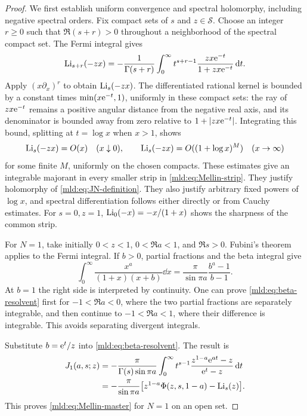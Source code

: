 \begin{proof}
We first establish uniform convergence and spectral holomorphy, including negative spectral orders. Fix compact sets of $s$ and $z\in\mathcal S$. Choose an integer $r\ge0$ such that $\Re(s+r)>0$ throughout a neighborhood of the spectral compact set. The Fermi integral gives
\[
 \operatorname{Li}_{s+r}(-zx)=-\frac1{\Gamma(s+r)}
   \int_0^\infty t^{s+r-1}\frac{zx\mathrm e^{-t}}{1+zx\mathrm e^{-t}}\,\mathrm{d} t.
\]
Apply $(x\partial_x)^r$ to obtain $\operatorname{Li}_s(-zx)$. The differentiated rational kernel is bounded by a constant times $\min(x\mathrm e^{-t},1)$, uniformly in these compact sets: the ray of $zx\mathrm e^{-t}$ remains a positive angular distance from the negative real axis, and its denominator is bounded away from zero relative to $1+|zx\mathrm e^{-t}|$. Integrating this bound, splitting at $t=\log x$ when $x>1$, shows
\[
 \operatorname{Li}_s(-zx)=O(x)\quad(x\downarrow0),\qquad
 \operatorname{Li}_s(-zx)=O((1+\log x)^M)\quad(x\to\infty)
\]
for some finite $M$, uniformly on the chosen compacts. These estimates give an integrable majorant in every smaller strip in \eqref{mld:eq:Mellin-strip}. They justify holomorphy of \eqref{mld:eq:JN-definition}. They also justify arbitrary fixed powers of $\log x$, and spectral differentiation follows either directly or from Cauchy estimates. For $s=0,z=1$, $\operatorname{Li}_0(-x)=-x/(1+x)$ shows the sharpness of the common strip.

For $N=1$, take initially $0<z<1$, $0<\Re a<1$, and $\Re s>0$. Fubini's theorem applies to the Fermi integral. If $b>0$, partial fractions and the beta integral give
\begin{equation}\label{mld:eq:beta-resolvent}
 \int_0^\infty\frac{x^a}{(1+x)(x+b)}\dd x
       =\frac{\pi}{\sin\pi a}\frac{b^a-1}{b-1}.
\end{equation}
At $b=1$ the right side is interpreted by continuity. One can prove \eqref{mld:eq:beta-resolvent} first for $-1<\Re a<0$, where the two partial fractions are separately integrable, and then continue to $-1<\Re a<1$, where their difference is integrable. This avoids separating divergent integrals.

Substitute $b=\mathrm e^t/z$ into \eqref{mld:eq:beta-resolvent}. The result is
\begin{align*}
 J_1(a,s;z)
 &=-\frac{\pi}{\Gamma(s)\sin\pi a}
   \int_0^\infty t^{s-1}
      \frac{z^{1-a}\mathrm e^{at}-z}{\mathrm e^t-z}\,\mathrm{d} t\\
 &=-\frac{\pi}{\sin\pi a}
       \big[z^{1-a}\Phi(z,s,1-a)-\operatorname{Li}_s(z)\big].
\end{align*}
This proves \eqref{mld:eq:Mellin-master} for $N=1$ on an open set.


\end{proof}
